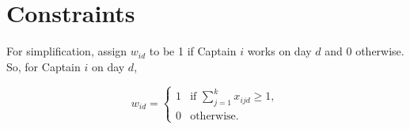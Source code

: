 \documentclass[12pt]{article}
\begin{document}

\section*{Constraints}
For simplification, assign
$w_{id}$ to be 1 if Captain $i$ works on day $d$ and 0 otherwise. So, for Captain $i$ on day $d$, 

$$w_{id} = \begin{cases} 1 & \mbox{if } \sum_{j = 1}^{k}x_{ijd} \ge 1,\\
0 & \mbox{otherwise}. \end{cases}$$
\end{document}
